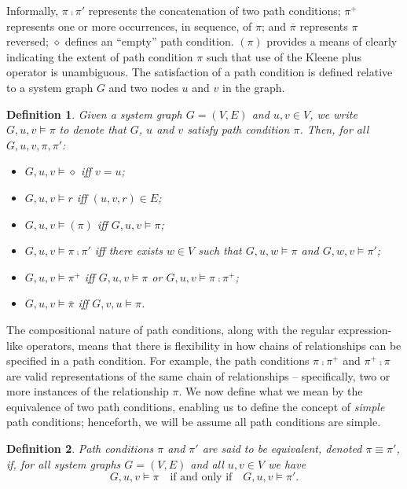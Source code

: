 \documentclass{article}
\newtheorem{definition}{Definition}
\begin{document}
Informally, $\pi \comp \pi'$ represents the concatenation of two path conditions; $\pi^+$ represents one or more occurrences, in sequence, of $\pi$; and $\overline{\pi}$ represents $\pi$ reversed; $\diamond$ defines an ``empty'' path condition.
$(\pi)$ provides a means of clearly indicating the extent of path condition $\pi$ such that use of the Kleene plus operator is unambiguous.
The satisfaction of a path condition is defined relative to a system graph $G$ and two nodes $u$ and $v$ in the graph.

\begin{definition}\label{def:path-condition-satisfaction}Given a system graph $G = (V,E)$ and $u,v \in V$, we write $G,u,v \models \pi$ to denote that  $G$, $u$ and $v$ \emph{satisfy path condition} $\pi$.
    Then, for all $G,u,v,\pi,\pi'$:
    \begin{itemize}
        \item $G,u,v \models \diamond$ iff $v = u$;
        \item $G,u,v \models r$ iff $(u,v,r) \in E$;
        \item $G,u,v \models (\pi)$ iff $G,u,v \models \pi$;
        \item $G,u,v \models \pi \comp \pi'$ iff there exists $w \in V$ such that $G,u,w \models \pi$ and $G,w,v \models \pi'$;
        \item $G,u,v \models \pi^+$ iff $G,u,v \models \pi$ or $G,u,v \models \pi \comp \pi^+$;
        \item $G,u,v \models \overline{\pi}$ iff $G,v,u \models \pi$.
    \end{itemize}
\end{definition}

The compositional nature of path conditions, along with the regular expression-like operators, means that there is flexibility in how chains of relationships can be specified in a path condition.
For example, the path conditions $\pi \comp \pi^+$ and $\pi^+ \comp \pi$ are valid representations of the same chain of relationships -- specifically, two or more instances of the relationship $\pi$.
We now define what we mean by the equivalence of two path conditions, enabling us to define the concept of \emph{simple} path conditions; henceforth, we will be assume all path conditions are simple.

\begin{definition}\label{def:path-condition-equivalence}Path conditions $\pi$ and $\pi'$ are said to be \emph{equivalent}, denoted $\pi \equiv \pi'$, if, for all system graphs $G = (V,E)$ and all $u,v \in V$ we have
    \[
        G,u,v \models \pi \quad\text{if and only if} \quad G,u,v \models \pi'.
    \]
\end{definition}
\end{document}
